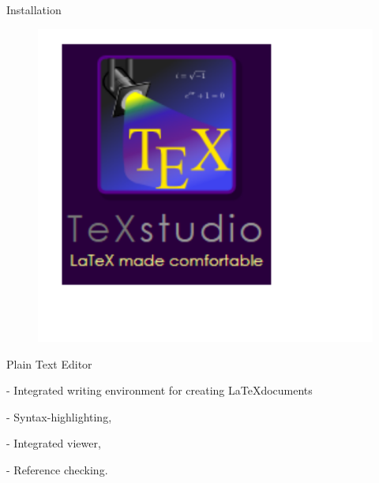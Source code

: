 \documentclass{beamer}
\begin{document}
\subsection*{}
\begin{frame}{Installation}


\begin{figure}
\includegraphics[width=0.9\linewidth]{figures/texstudio.png} 
\label{fig:wrapfig}
\end{figure}

\begin{block}{Plain Text Editor}
\end{block}
- Integrated writing environment for creating \LaTeX documents

- Syntax-highlighting,

- Integrated viewer,

- Reference checking.
    
\end{frame}
\end{document}
